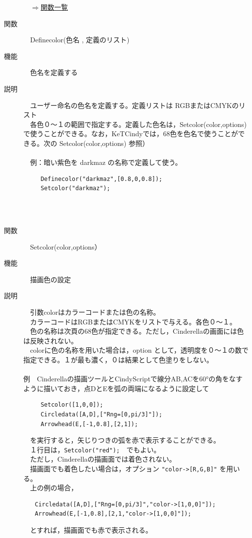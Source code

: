 \documentclass[papersize,a4paper,12pt,uplatex]{jsarticle}
\begin{document}
\begin{description}
\begin{flushright}　\hyperlink{functionlist}{$\Rightarrow$関数一覧}\end{flushright}
\newpage
\hypertarget{definecolor}{}
\item[関数]　Definecolor(色名 , 定義のリスト)
\item[機能]　色名を定義する
\item[説明]　ユーザー命名の色名を定義する。定義リストは RGBまたはCMYKのリスト\\
　各色０〜１の範囲で指定する。定義した色名は，Setcolor(color,options)　で使うことができる。なお，KeTCindyでは，68色を色名で使うことができる。次の Setcolor(color,options) 参照）\\
　\\
　例：暗い紫色を darkmaz の名称で定義して使う。
\begin{verbatim}
　　　Definecolor("darkmaz",[0.8,0,0.8]);
　　　Setcolor("darkmaz");
\end{verbatim}
\hypertarget{setcolor}{}
　\\
　\\
\item[関数]　Setcolor(color,options）
\item[機能]　描画色の設定
\item[説明]　引数colorはカラーコードまたは色の名称。\\
　カラーコードはRGBまたはCMYKをリストで与える。各色０〜１。\\
　色の名称は次頁の68色が指定できる。ただし，Cinderellaの画面には色は反映されない。\\
　colorに色の名称を用いた場合は，option として，透明度を０〜１の数で指定できる。１が最も濃く，０は結果として色塗りをしない。\\
　\\
例　Cinderellaの描画ツールとCindyScriptで線分AB,ACを60°の角をなすように描いておき，点DとEを弧の両端になるように設定して
\begin{verbatim}
　　　Setcolor([1,0,0]);
　　　Circledata([A,D],["Rng=[0,pi/3]"]);
　　　Arrowhead(E,[-1,0.8],[2,1]);
\end{verbatim}
　を実行すると，矢じりつきの弧を赤で表示することができる。\\
　１行目は，\verb|Setcolor("red");|　でもよい。\\
　ただし，Cinderellaの描画面では着色されない。\\
　描画面でも着色したい場合は，オプション \verb|"color->[R,G,B]"| を用いる。\\
　上の例の場合，
\begin{verbatim}
　　Circledata([A,D],["Rng=[0,pi/3]","color->[1,0,0]"]);
　　Arrowhead(E,[-1,0.8],[2,1,"color->[1,0,0]"]);
\end{verbatim}
　とすれば，描画面でも赤で表示される。\\


\end{description}
\end{document}
